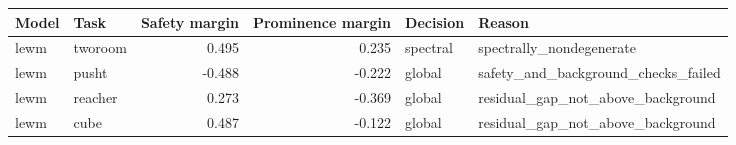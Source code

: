 \begin{tabular}{llrrll}
\toprule
Model & Task & Safety margin & Prominence margin & Decision & Reason \\
\midrule
lewm & tworoom & 0.495 & 0.235 & spectral & spectrally\_nondegenerate \\
lewm & pusht & -0.488 & -0.222 & global & safety\_and\_background\_checks\_failed \\
lewm & reacher & 0.273 & -0.369 & global & residual\_gap\_not\_above\_background \\
lewm & cube & 0.487 & -0.122 & global & residual\_gap\_not\_above\_background \\
\bottomrule
\end{tabular}

